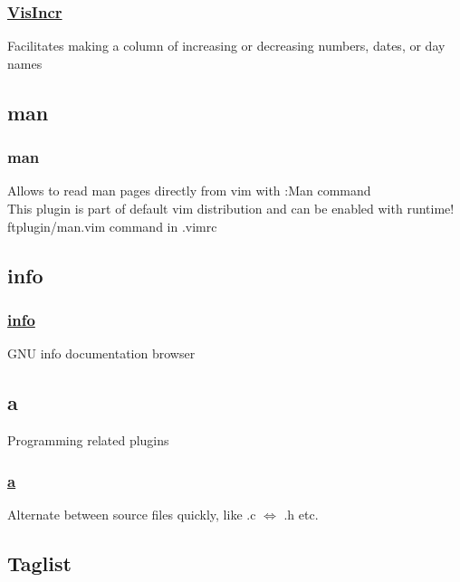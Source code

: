 \documentclass[14pt,svgnames,compress]{beamer}
\newcommand\hl[1]{\textcolor{HlColor}{#1}}
\newcommand\framesubtitlefontsize{\huge}
\newcommand\singleframesubtitle[1]{
    \begin{center}
        \framesubtitlefontsize #1
    \end{center}
}
\begin{document}
\begin{frame}
    \frametitle{
        \href{https://github.com/vim-scripts/VisIncr}
             {VisIncr}
    }
    \large
    Facilitates making a column of increasing or decreasing numbers, dates, or
    day names \\
\end{frame}


\subsection{man}

\begin{frame}
    \frametitle{man}
    \large
    Allows to read \hl{man pages} directly from vim with \hl{:Man} command \\
    \bigskip
    This plugin is part of default vim distribution and can be enabled with
    \hl{runtime! ftplugin/man.vim} command in .vimrc \\
\end{frame}


\subsection{info}

\begin{frame}
    \frametitle{
        \href{https://github.com/vim-scripts/info.vim}
             {info}
    }
    \large
    \hl{GNU info} documentation browser \\
\end{frame}


\subsection{a}

\begin{frame}
    \singleframesubtitle{Programming related plugins}
\end{frame}

\begin{frame}
    \frametitle{
        \href{https://github.com/vim-scripts/a.vim}
             {a}
    }
    \large
    Alternate between source files quickly, like \hl{.c} $\Longleftrightarrow$
    \hl{.h} etc. \\
\end{frame}


\subsection{Taglist}
\end{document}
